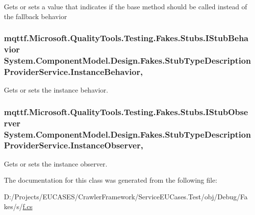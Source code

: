 Gets or sets a value that indicates if the base method should be called instead of the fallback behavior

\hypertarget{class_system_1_1_component_model_1_1_design_1_1_fakes_1_1_stub_type_description_provider_service_a14dd8b109609ed0ed1eb9179b8ea8274}{
\subsubsection[{Instance\-Behavior}]{\setlength{\rightskip}{0pt plus 5cm}mqttf.\-Microsoft.\-Quality\-Tools.\-Testing.\-Fakes.\-Stubs.\-I\-Stub\-Behavior System.\-Component\-Model.\-Design.\-Fakes.\-Stub\-Type\-Description\-Provider\-Service.\-Instance\-Behavior\hspace{0.3cm}{\ttfamily [get]}, {\ttfamily [set]}}}\label{class_system_1_1_component_model_1_1_design_1_1_fakes_1_1_stub_type_description_provider_service_a14dd8b109609ed0ed1eb9179b8ea8274}


Gets or sets the instance behavior.

\hypertarget{class_system_1_1_component_model_1_1_design_1_1_fakes_1_1_stub_type_description_provider_service_a1ba2e13c56ea797d4660b49b666286ea}{
\subsubsection[{Instance\-Observer}]{\setlength{\rightskip}{0pt plus 5cm}mqttf.\-Microsoft.\-Quality\-Tools.\-Testing.\-Fakes.\-Stubs.\-I\-Stub\-Observer System.\-Component\-Model.\-Design.\-Fakes.\-Stub\-Type\-Description\-Provider\-Service.\-Instance\-Observer\hspace{0.3cm}{\ttfamily [get]}, {\ttfamily [set]}}}\label{class_system_1_1_component_model_1_1_design_1_1_fakes_1_1_stub_type_description_provider_service_a1ba2e13c56ea797d4660b49b666286ea}


Gets or sets the instance observer.



The documentation for this class was generated from the following file\-:\begin{DoxyCompactItemize}
\item 
D\-:/\-Projects/\-E\-U\-C\-A\-S\-E\-S/\-Crawler\-Framework/\-Service\-E\-U\-Cases.\-Test/obj/\-Debug/\-Fakes/s/\hyperlink{s_2f_8cs}{f.\-cs}\end{DoxyCompactItemize}
